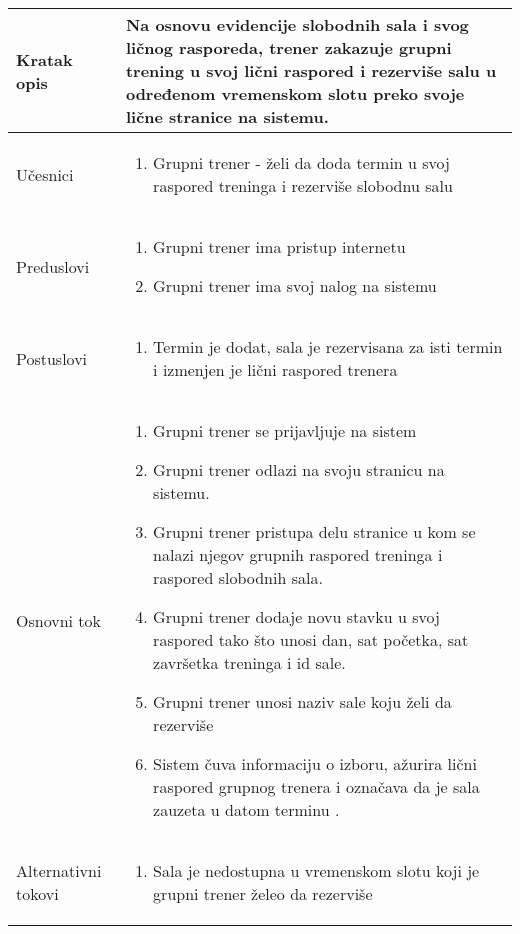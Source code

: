 \documentclass[../grupniTreninzi.tex]{subfiles}
\begin{document}
\begin{longtable}{| p{} | p{} |} 
\hline
    Kratak opis &  Na osnovu evidencije slobodnih sala i svog ličnog rasporeda, trener zakazuje grupni trening u svoj lični raspored i rezerviše salu u određenom vremenskom slotu preko svoje lične stranice na sistemu.\\ 
\hline    
    Učesnici &
    \begin{enumerate}
        \item Grupni trener - želi da doda termin u svoj raspored treninga i rezerviše slobodnu salu
    \end{enumerate}\\
\hline
   Preduslovi & 
   \begin{enumerate}
        \item Grupni trener ima pristup internetu
        \item Grupni trener ima svoj nalog na sistemu
    \end{enumerate}\\
\hline  
    Postuslovi &
    \begin{enumerate}
        \item Termin je dodat, sala je rezervisana za isti termin i izmenjen je lični raspored trenera
    \end{enumerate}\\
\hline
    Osnovni tok & 
    \begin{enumerate}
        \item Grupni trener se prijavljuje na sistem
        \item Grupni trener odlazi na svoju stranicu na sistemu.
        \item Grupni trener pristupa delu stranice u kom se nalazi njegov grupnih raspored treninga i raspored slobodnih sala.
        \item Grupni trener dodaje novu stavku u svoj raspored tako što unosi dan, sat početka, sat završetka treninga i id sale.
        \item Grupni trener unosi naziv sale koju želi da rezerviše
        \item Sistem čuva informaciju o izboru, ažurira lični raspored grupnog trenera i označava da je sala zauzeta u datom terminu .
    \end{enumerate}\\
\hline
    Alternativni tokovi & 
       \begin{enumerate}
        \item Sala je nedostupna u vremenskom slotu koji je grupni trener želeo da rezerviše

\end{enumerate}
\end{longtable}
\end{document}
